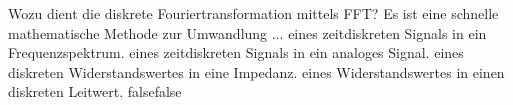    {Wozu dient die diskrete Fouriertransformation mittels FFT? Es ist eine schnelle mathematische Methode zur Umwandlung ...}
    {eines zeitdiskreten Signals in ein Frequenzspektrum.}
    {eines zeitdiskreten Signals in ein analoges Signal.}
    {eines diskreten Widerstandswertes in eine Impedanz.}
    {eines Widerstandswertes in einen diskreten Leitwert.}
    {false}{false}